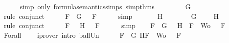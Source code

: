 \begin{isabellebody}
\ \ \ \ \isamarkupfalse%
\ {\isacharparenleft}simp\ only{\isacharcolon}\ formula{\isacharunderscore}semantics{\isachardot}simps{\isacharparenleft}{}{\isacharparenright}\ simp{\isacharunderscore}thms{\isacharparenleft}{}{\isacharparenright}{\isacharparenright}\ \isanewline
\ \ \isamarkupfalse%
\ \isamarkupfalse%
\ {\isachardoublequoteopen}{\isasymA}\ {\isasymTurnstile}\ G{\isachardoublequoteclose}\isanewline
\ \ \ \ \isamarkupfalse%
\ {\isacharparenleft}rule\ conjunct{}{\isacharparenright}\isanewline
\ \ \isamarkupfalse%
\ \isamarkupfalse%
\ {}{\isacharcolon}{\isachardoublequoteopen}{\isasymforall}F\ {\isasymin}\ {\isacharbraceleft}G{\isacharbraceright}{\isachardot}\ {\isasymA}\ {\isasymTurnstile}\ F{\isachardoublequoteclose}\isanewline
\ \ \ \ \isamarkupfalse%
\ simp\isanewline
\ \ \isamarkupfalse%
\ {\isachardoublequoteopen}{\isasymA}\ {\isasymTurnstile}\ \isactrlbold {\isasymnot}\ H{\isachardoublequoteclose}\isanewline
\ \ \ \ \isamarkupfalse%
\ {\isacartoucheopen}{\isasymA}\ {\isasymTurnstile}\ G\ {\isasymand}\ {\isasymA}\ {\isasymTurnstile}\ \isactrlbold {\isasymnot}\ H{\isacartoucheclose}\ \isamarkupfalse%
\ {\isacharparenleft}rule\ conjunct{}{\isacharparenright}\isanewline
\ \ \isamarkupfalse%
\ \isamarkupfalse%
\ {}{\isacharcolon}{\isachardoublequoteopen}{\isasymforall}F\ {\isasymin}\ {\isacharbraceleft}\isactrlbold {\isasymnot}\ H{\isacharbraceright}{\isachardot}\ {\isasymA}\ {\isasymTurnstile}\ F{\isachardoublequoteclose}\isanewline
\ \ \ \ \isamarkupfalse%
\ simp\isanewline
\ \ \isamarkupfalse%
\ {\isachardoublequoteopen}{\isasymforall}F\ {\isasymin}\ {\isacharparenleft}{\isacharbraceleft}G{\isacharbraceright}\ {\isasymunion}\ {\isacharbraceleft}\isactrlbold {\isasymnot}\ H{\isacharbraceright}{\isacharparenright}\ {\isasymunion}\ {\isacharparenleft}{\isacharbraceleft}F{\isacharbraceright}\ {\isasymunion}\ Wo{\isacharparenright}{\isachardot}\ {\isasymA}\ {\isasymTurnstile}\ F{\isachardoublequoteclose}\isanewline
\ \ \ \ \isamarkupfalse%
\ Forall{}\ {}\ {}\ \isamarkupfalse%
\ {\isacharparenleft}iprover\ intro{\isacharcolon}\ ball{\isacharunderscore}Un{\isacharparenright}\isanewline
\ \ \isamarkupfalse%
\ \isamarkupfalse%
\ {\isachardoublequoteopen}{\isasymforall}F\ {\isasymin}\ {\isacharbraceleft}G{\isacharcomma}\isactrlbold {\isasymnot}\ H{\isacharcomma}F{\isacharbraceright}\ {\isasymunion}\ Wo{\isachardot}\ {\isasymA}\ {\isasymTurnstile}\ F{\isachardoublequoteclose}\isanewline

\end{isabellebody}
